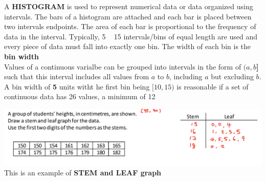 A \textbf{HISTOGRAM} is used to represent numerical data or data organized using intervals. The bars of a 
histogram are attached and each bar is placed between two intervals endpoints. The area of each bar is proportional
to the frequency of data in the interval. Typically, 5 ~ 15 intervals/bins of equal length are used and every piece
of data must fall into exactly one bin. The width of each bin is the \textbf{bin width} \\

Values of a continuous varialbe can be grouped into intervals in the form of \textbf{$(a, b$]} such that this interval 
includes all values from $a$ to $b$, including $a$ but excluding $b$.\\

A bin width of \textbf{5} units witht he first bin being $[10, 15)$ is reasonable if a set of continuous data 
has 26 values, a minimum of 12\\

\begin{example}

    \begin{center}
        \includegraphics[width=\textwidth]{pictures/3.2.1.png}
        This is an example of \textbf{STEM and LEAF graph}
    \end{center}

\end{example}

